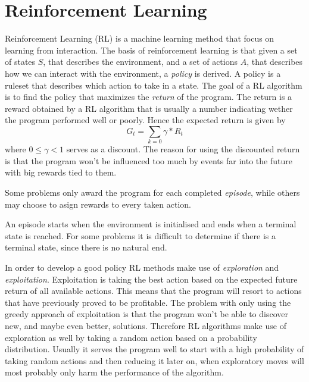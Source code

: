 \documentclass[11pt]{article}
\begin{document}
\maketitle

\section{Reinforcement Learning}

Reinforcement Learning (RL) is a machine learning method that focus on learning from interaction.
The basis of reinforcement learning is that given a set of states $S$, that describes the environment,
and a set of actions $A$, that describes how we can interact with the environment,
a \textit{policy} is derived.
A policy is a ruleset that describes which action to take in a state.
The goal of a RL algorithm is to find the policy that
maximizes the \textit{return} of the program.
The return is a reward obtained by a RL algorithm that is usually a number indicating
wether the program performed well or poorly.
Hence the expected return is given by
\begin{equation}
    G_t = \sum\limits_{k=0} \gamma * R_{t}
\end{equation}
where $0 \leq \gamma < 1$ serves as a discount.
The reason for using the discounted return is that the program won't be influenced
too much by events far into the future with big rewards tied to them.

Some problems only award the program for each completed \textit{episode},
while others may choose to asign rewards to every taken action.

An episode starts when the environment is initialised and ends when a terminal state is reached.
For some problems it is difficult to determine if there is a terminal state, since there
is no natural end.

In order to develop a good policy RL methods make use of \textit{exploration} and \textit{exploitation}.
Exploitation is taking the best action based on the expected future return of all available actions.
This means that the program will resort to actions that have previously proved to be profitable.
The problem with only using the greedy approach of exploitation is that the program won't be able
to discover new, and maybe even better, solutions.
Therefore RL algorithms make use of exploration as well by taking a random action based
on a probability distribution.
Usually it serves the program well to start with a high probability of taking random actions
and then reducing it later on, when exploratory moves will most probably only harm the
performance of the algorithm.
\end{document}
